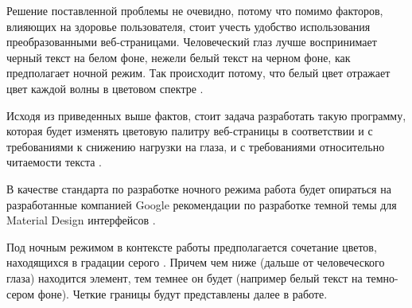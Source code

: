 Решение поставленной проблемы не очевидно, потому что помимо факторов, влияющих на здоровье пользователя, стоит учесть удобство использования преобразованными веб-страницами. Человеческий глаз лучше воспринимает черный текст на белом фоне, нежели белый текст на черном фоне, как предполагает ночной режим. Так происходит потому, что белый цвет отражает цвет каждой волны в цветовом спектре \cite{whitecolor}.

Исходя из приведенных выше фактов, стоит задача разработать такую программу, которая будет изменять цветовую палитру веб-страницы в соответствии и с требованиями к снижению нагрузки на глаза, и с требованиями относительно читаемости текста \cite{wcag}.

В качестве стандарта по разработке ночного режима работа будет опираться на разработанные компанией Google рекомендации по разработке темной темы для Material Design интерфейсов \cite{material}. 

Под ночным режимом в контексте работы предполагается сочетание цветов, находящихся в градации серого \cite{grayscale}. Причем чем ниже (дальше от человеческого глаза) находится элемент, тем темнее он будет (например белый текст на темно-сером фоне). Четкие границы будут представлены далее в работе.
